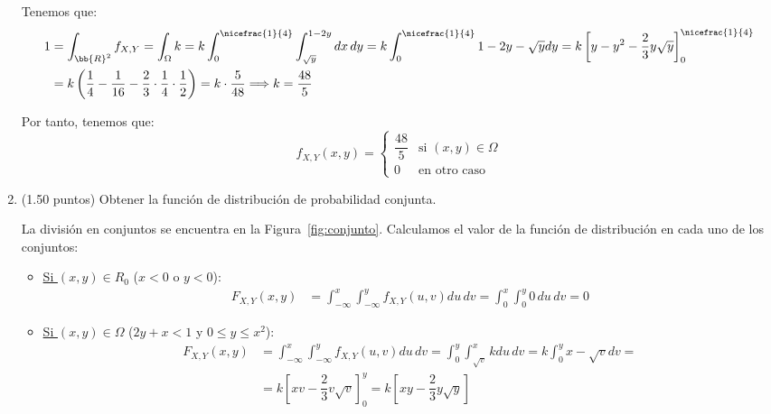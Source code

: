 \documentclass[12pt]{article}
\begin{document}
\begin{ejercicio}[5 puntos]
\begin{enumerate}
            
            Tenemos que:
            \begin{align*}
                1&=\int_{\bb{R}^2} f_{X,Y}
                = \int_{\Omega} k
                = k\int_{0}^{\nicefrac{1}{4}}\int_{\sqrt{y}}^{1-2y}dx\,dy
                = k\int_{0}^{\nicefrac{1}{4}}1-2y-\sqrt{y}dy
                = k\left[y-y^2-\dfrac{2}{3}y\sqrt{y}\right]_{0}^{\nicefrac{1}{4}}\\
                &= k\left(\dfrac{1}{4}-\dfrac{1}{16}-\dfrac{2}{3}\cdot \dfrac{1}{4}\cdot \dfrac{1}{2}\right)
                = k\cdot \dfrac{5}{48}
                \Longrightarrow
                k=\dfrac{48}{5}
            \end{align*}

            Por tanto, tenemos que:
            \begin{equation*}
                f_{X,Y}(x,y) = \begin{cases}
                    \dfrac{48}{5} & \text{si } (x,y) \in \Omega\\
                    0 & \text{en otro caso}
                \end{cases}
            \end{equation*}
            \item (1.50 puntos) Obtener la función de distribución de probabilidad conjunta.
            
            La división en conjuntos se encuentra en la Figura~\ref{fig:conjunto}. Calculamos el valor de la función de distribución en cada uno de los conjuntos:
            \begin{itemize}
                \item \ul{Si $(x,y) \in R_0$} ($x<0$ o $y<0$):
                \begin{align*}
                    F_{X,Y}(x,y) &= \int_{-\infty}^x\int_{-\infty}^y f_{X,Y}(u,v)du\,dv
                    = \int_{0}^x\int_{0}^y 0\,du\,dv = 0
                \end{align*}

                \item \ul{Si $(x,y) \in \Omega$} ($2y+x<1$ y $0\leq y\leq x^2$):
                \begin{align*}
                    F_{X,Y}(x,y) &= \int_{-\infty}^x\int_{-\infty}^y f_{X,Y}(u,v)du\,dv
                    = \int_{0}^y \int_{\sqrt{v}}^x k du\,dv
                    = k\int_{0}^y x-\sqrt{v}dv
                    =\\&= k\left[xv-\dfrac{2}{3}v\sqrt{v}\right]_{0}^y
                    = k\left[xy-\dfrac{2}{3}y\sqrt{y}\right]
                \end{align*}


\end{itemize}
\end{enumerate}
\end{ejercicio}
\end{document}
